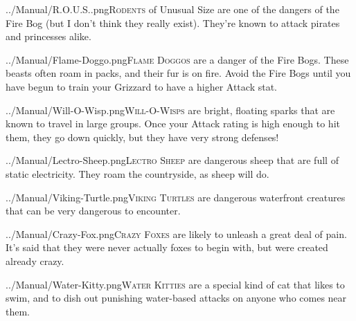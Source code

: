 \documentclass[10pt,twocolumn,openany,article]{memoir}
\begin{document}
\vspace{14pt}

\lettrine[image=true,                lines=5,               findent=3pt,
nindent=3pt]{../Manual/R.O.U.S..png}{Rodents} of Unusual Size are one of
the  dangers of  the Fire  Bog (but  I don't  think they  really exist).
They're known to attack pirates and princesses alike.

\vspace{14pt}

\lettrine[image=true,                lines=5,               findent=3pt,
nindent=3pt]{../Manual/Flame-Doggo.png}{Flame  Doggos} are  a danger  of
the Fire  Bogs. These beasts  often roam in packs,  and their fur  is on
fire. Avoid the Fire Bogs until you have begun to train your Grizzard to
have a higher Attack stat.

\vspace{14pt}

\lettrine[image=true,                lines=5,               findent=3pt,
nindent=3pt]{../Manual/Will-O-Wisp.png}{Will-O-Wisps}     are    bright,
floating sparks  that are  known to  travel in  large groups.  Once your
Attack rating is high enough to hit them, they go down quickly, but they
have very strong defenses!

\vspace{14pt}

\lettrine[image=true,                lines=5,               findent=3pt,
nindent=3pt]{../Manual/Lectro-Sheep.png}{Lectro  Sheep}   are  dangerous
sheep that are full of static electricity. They roam the countryside, as
sheep will do.

\vspace{14pt}

\lettrine[image=true,                lines=5,               findent=3pt,
nindent=3pt]{../Manual/Viking-Turtle.png}{Viking Turtles}  are dangerous
waterfront creatures that can be very dangerous to encounter.

\vspace{14pt}

\lettrine[image=true,                lines=5,               findent=3pt,
nindent=3pt]{../Manual/Crazy-Fox.png}{Crazy Foxes} are likely to unleash
a great deal of  pain. It's said that they were  never actually foxes to
begin with, but were created already crazy.

\vspace{14pt}

\lettrine[image=true,                lines=5,               findent=3pt,
nindent=3pt]{../Manual/Water-Kitty.png}{Water  Kitties}  are  a  special
kind of  cat that likes to  swim, and to dish  out punishing water-based
attacks on anyone who comes near them.
\end{document}
